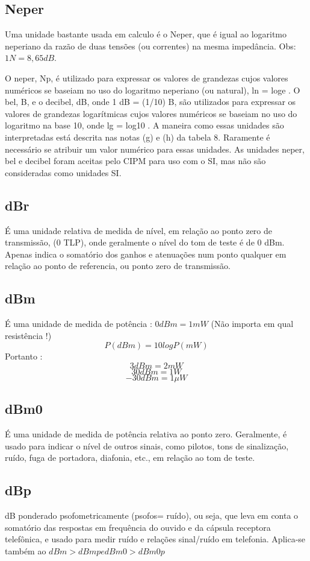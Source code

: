 \documentclass[
	article,			%
	11pt,				%
	oneside,			%
	a4paper,			%
	english,			%
	brazil,				%
	sumario=tradicional
	]{abntex2}
\begin{document}
\subsection{Neper}
Uma unidade bastante usada em calculo é o Neper, que é igual ao logaritmo neperiano da razão de duas tensões (ou correntes) na mesma impedância. Obs: $1 N = 8,65 dB.$

\begin{citacao}
O neper, Np, é utilizado para expressar os valores de grandezas cujos valores numéricos se baseiam no uso do logaritmo neperiano (ou natural), ln = loge . O bel, B, e o decibel, dB, onde 1 dB = (1/10) B, são utilizados para expressar os valores de
grandezas logarítmicas cujos valores numéricos se baseiam no uso do logaritmo na
base 10, onde lg = log10 . A maneira como essas unidades são interpretadas está
descrita nas notas (g) e (h) da tabela 8. Raramente é necessário se atribuir um valor
numérico para essas unidades. As unidades neper, bel e decibel foram aceitas
pelo CIPM para uso com o SI, mas não são consideradas como unidades SI.\cite{santos2012sistema}
\end{citacao}

\subsection{dBr}
É uma unidade relativa de medida de nível, em relação ao ponto zero de transmissão, (0 TLP), onde geralmente o nível do tom de teste é de 0 dBm.
Apenas indica o somatório dos ganhos e atenuações num ponto qualquer em relação ao ponto de referencia, ou ponto zero de transmissão.

\subsection{dBm}
É uma unidade de medida de potência : $0 dBm = 1 mW$ (Não importa em qual resistência !)
$$P (dBm) = 10 log P (mW)$$
Portanto : 
$$3 dBm = 2 mW$$ $$30 dBm = 1W$$ $$-30 dBm = 1 \mu W$$

\subsection{dBm0}
É uma unidade de medida de potência relativa ao ponto zero.
Geralmente, é usado para indicar o nível de outros sinais, como pilotos, tons de sinalização, ruído, fuga de portadora, diafonia, etc., em relação ao tom de teste.

\subsection{dBp}
dB ponderado psofometricamente (psofos= ruído), ou seja, que leva
em conta o somatório das respostas em frequência do ouvido e da cápsula
receptora telefônica, e usado para medir ruído e relações sinal/ruído em
telefonia. Aplica-se também ao $dBm > dBmp e dBm0 > dBm0p$
\end{document}
